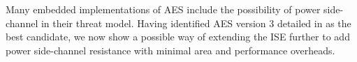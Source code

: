 
Many embedded implementations of AES include the possibility of
power side-channel in their threat model.
Having identified AES version $3$ detailed in
 as the best candidate, we now show a possible
way of extending the ISE further to add power side-channel resistance
with minimal area and performance overheads.

